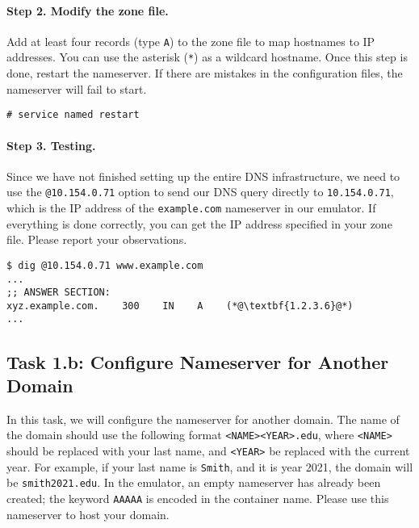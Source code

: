 \paragraph{Step 2. Modify the zone file.}
Add at least four records (type \texttt{A}) to the zone file
to map hostnames to IP addresses. You can use the 
asterisk (\texttt{*}) as a wildcard hostname. 
Once this step is done, restart the nameserver. 
If there are mistakes in the configuration files,
the nameserver will fail to start.

\begin{lstlisting}
# service named restart
\end{lstlisting}


\paragraph{Step 3. Testing.} 
Since we have not finished setting up the entire 
DNS infrastructure, we need to 
use the \texttt{@10.154.0.71} option to send our DNS query
directly to \texttt{10.154.0.71}, which is the IP
address of the \texttt{example.com} nameserver in our emulator.
If everything is done correctly, you can get the IP address specified
in your zone file. Please report your observations.

\begin{lstlisting}
$ dig @10.154.0.71 www.example.com
... 
;; ANSWER SECTION:
xyz.example.com.    300    IN    A    (*@\textbf{1.2.3.6}@*)
...
\end{lstlisting}




\subsection{Task 1.b: Configure Nameserver for Another Domain} 


In this task, we will configure the nameserver for another domain.
The name of the domain should use the following 
format \texttt{<NAME><YEAR>.edu}, where \texttt{<NAME>} should be 
replaced with your last name, and \texttt{<YEAR>} be replaced 
with the current year. 
For example, if your last name is \texttt{Smith}, and 
it is year 2021, the domain will be \texttt{smith2021.edu}.  
In the emulator, an empty nameserver has already been created;
the keyword \texttt{AAAAA} is encoded in the container name. Please 
use this nameserver to host your domain. 

